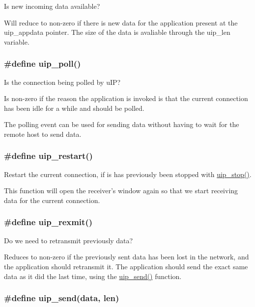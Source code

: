 Is new incoming data available? 

Will reduce to non-zero if there is new data for the application present at the uip\_\-appdata pointer. The size of the data is avaliable through the uip\_\-len variable. \hypertarget{a00064_g58bb90796c1cdad3aac2ecf44d87b20e}{
\subsubsection[uip\_\-poll]{\setlength{\rightskip}{0pt plus 5cm}\#define uip\_\-poll()}}
\label{a00064_g58bb90796c1cdad3aac2ecf44d87b20e}


Is the connection being polled by u\-IP? 

Is non-zero if the reason the application is invoked is that the current connection has been idle for a while and should be polled.

The polling event can be used for sending data without having to wait for the remote host to send data. \hypertarget{a00064_g81ac47cee1c18f6aa479044069db7ca3}{
\subsubsection[uip\_\-restart]{\setlength{\rightskip}{0pt plus 5cm}\#define uip\_\-restart()}}
\label{a00064_g81ac47cee1c18f6aa479044069db7ca3}


Restart the current connection, if is has previously been stopped with \hyperlink{a00064_g0a8bb9d6d0f1f56852ccfccbbad6c5d8}{uip\_\-stop()}. 

This function will open the receiver's window again so that we start receiving data for the current connection. \hypertarget{a00064_ga8933ad15a2e2947dae4a5cff50e6007}{
\subsubsection[uip\_\-rexmit]{\setlength{\rightskip}{0pt plus 5cm}\#define uip\_\-rexmit()}}
\label{a00064_ga8933ad15a2e2947dae4a5cff50e6007}


Do we need to retransmit previously data? 

Reduces to non-zero if the previously sent data has been lost in the network, and the application should retransmit it. The application should send the exact same data as it did the last time, using the \hyperlink{a00064_gb59415b2801e568f52bc1d86ef10e159}{uip\_\-send()} function. \hypertarget{a00064_gb59415b2801e568f52bc1d86ef10e159}{
\subsubsection[uip\_\-send]{\setlength{\rightskip}{0pt plus 5cm}\#define uip\_\-send(data, len)}}
\label{a00064_gb59415b2801e568f52bc1d86ef10e159}


